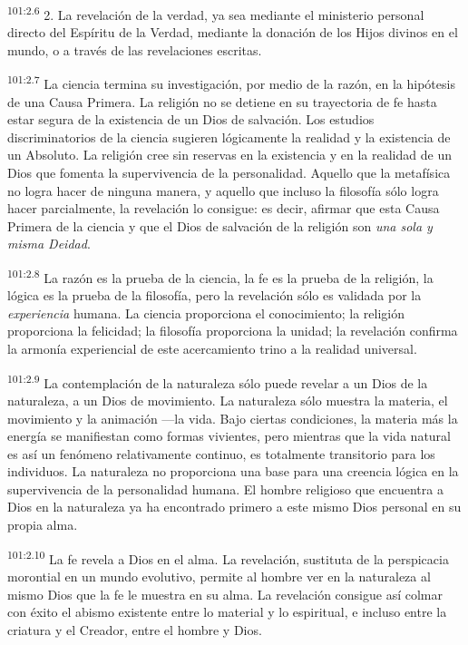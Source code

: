 \documentclass[twoside, 11pt]{book}
\begin{document}
\par
\textsuperscript{101:2.6} 2. La revelación de la verdad, ya sea mediante el ministerio personal directo del Espíritu de la Verdad, mediante la donación de los Hijos divinos en el mundo, o a través de las revelaciones escritas.

\par
\textsuperscript{101:2.7} La ciencia termina su investigación, por medio de la razón, en la hipótesis de una Causa Primera. La religión no se detiene en su trayectoria de fe hasta estar segura de la existencia de un Dios de salvación. Los estudios discriminatorios de la ciencia sugieren lógicamente la realidad y la existencia de un Absoluto. La religión cree sin reservas en la existencia y en la realidad de un Dios que fomenta la supervivencia de la personalidad. Aquello que la metafísica no logra hacer de ninguna manera, y aquello que incluso la filosofía sólo logra hacer parcialmente, la revelación lo consigue: es decir, afirmar que esta Causa Primera de la ciencia y que el Dios de salvación de la religión son \textit{una sola y misma Deidad}.

\par
\textsuperscript{101:2.8} La razón es la prueba de la ciencia, la fe es la prueba de la religión, la lógica es la prueba de la filosofía, pero la revelación sólo es validada por la \textit{experiencia} humana. La ciencia proporciona el conocimiento; la religión proporciona la felicidad; la filosofía proporciona la unidad; la revelación confirma la armonía experiencial de este acercamiento trino a la realidad universal.

\par
\textsuperscript{101:2.9} La contemplación de la naturaleza sólo puede revelar a un Dios de la naturaleza, a un Dios de movimiento. La naturaleza sólo muestra la materia, el movimiento y la animación ---la vida. Bajo ciertas condiciones, la materia más la energía se manifiestan como formas vivientes, pero mientras que la vida natural es así un fenómeno relativamente continuo, es totalmente transitorio para los individuos. La naturaleza no proporciona una base para una creencia lógica en la supervivencia de la personalidad humana. El hombre religioso que encuentra a Dios en la naturaleza ya ha encontrado primero a este mismo Dios personal en su propia alma.

\par
\textsuperscript{101:2.10} La fe revela a Dios en el alma. La revelación, sustituta de la perspicacia morontial en un mundo evolutivo, permite al hombre ver en la naturaleza al mismo Dios que la fe le muestra en su alma. La revelación consigue así colmar con éxito el abismo existente entre lo material y lo espiritual, e incluso entre la criatura y el Creador, entre el hombre y Dios.
\end{document}
